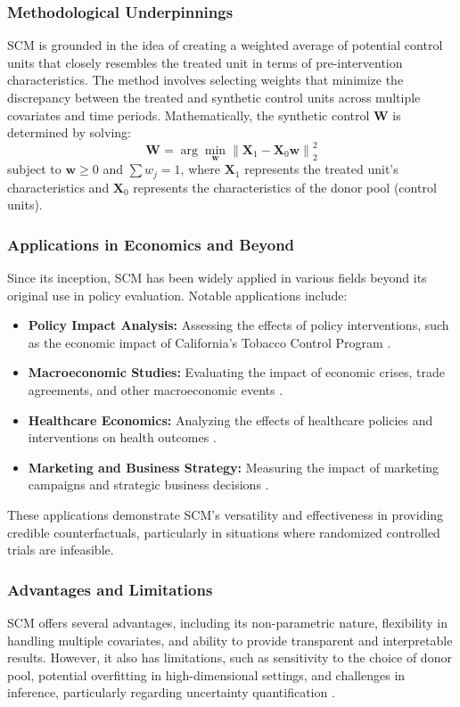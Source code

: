 \subsubsection{Methodological Underpinnings}
SCM is grounded in the idea of creating a weighted average of potential control units that closely resembles the treated unit in terms of pre-intervention characteristics. The method involves selecting weights that minimize the discrepancy between the treated and synthetic control units across multiple covariates and time periods. Mathematically, the synthetic control $\mathbf{W}$ is determined by solving:
\[
\mathbf{W} = \arg\min_{\mathbf{w}} \left\| \mathbf{X}_1 - \mathbf{X}_0 \mathbf{w} \right\|_2^2
\]
subject to $\mathbf{w} \geq 0$ and $\sum w_j = 1$, where $\mathbf{X}_1$ represents the treated unit's characteristics and $\mathbf{X}_0$ represents the characteristics of the donor pool (control units).

\subsubsection{Applications in Economics and Beyond}
Since its inception, SCM has been widely applied in various fields beyond its original use in policy evaluation. Notable applications include:
\begin{itemize}
    \item \textbf{Policy Impact Analysis:} Assessing the effects of policy interventions, such as the economic impact of California's Tobacco Control Program \cite{Abadie2010}.
    \item \textbf{Macroeconomic Studies:} Evaluating the impact of economic crises, trade agreements, and other macroeconomic events \cite{Abadie2015}.
    \item \textbf{Healthcare Economics:} Analyzing the effects of healthcare policies and interventions on health outcomes \cite{Doudchenko2016}.
    \item \textbf{Marketing and Business Strategy:} Measuring the impact of marketing campaigns and strategic business decisions \cite{Galiani2017}.
\end{itemize}

These applications demonstrate SCM's versatility and effectiveness in providing credible counterfactuals, particularly in situations where randomized controlled trials are infeasible.

\subsubsection{Advantages and Limitations}
SCM offers several advantages, including its non-parametric nature, flexibility in handling multiple covariates, and ability to provide transparent and interpretable results. However, it also has limitations, such as sensitivity to the choice of donor pool, potential overfitting in high-dimensional settings, and challenges in inference, particularly regarding uncertainty quantification \cite{Chernozhukov2021}.

